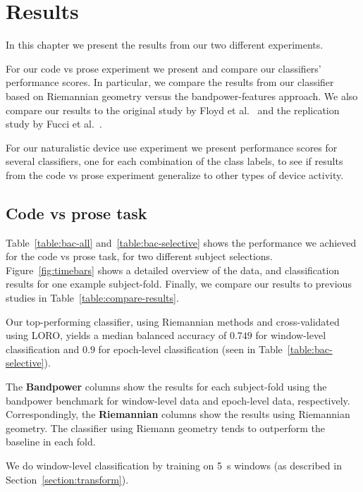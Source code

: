 \chapter{Results}\label{section:results}

    In this chapter we present the results from our two different experiments.

    For our code vs prose experiment we present and compare our classifiers' performance scores. In particular, we compare the results from our classifier based on Riemannian geometry versus the bandpower-features approach. We also compare our results to the original study by Floyd et al.~\cite{floyd_decoding_2017} and the replication study by Fucci et al.~\cite{fucci_replication_2019}. 

    For our naturalistic device use experiment we present performance scores for several classifiers, one for each combination of the class labels, to see if results from the code vs prose experiment generalize to other types of device activity.

    \pagebreak
    \section{Code vs prose task}
        Table~\ref{table:bac-all} and~\ref{table:bac-selective} shows the performance we achieved for the code vs prose task, for two different subject selections. Figure~\ref{fig:timebars} shows a detailed overview of the data, and classification results for one example subject-fold. Finally, we compare our results to previous studies in Table~\ref{table:compare-results}.

        

        Our top-performing classifier, using Riemannian methods and cross-validated using LORO, yields a median balanced accuracy of $0.749$  for window-level classification and $0.9$ for epoch-level classification (seen in Table~\ref{table:bac-selective}).

        The \textbf{Bandpower} columns show the results for each subject-fold using the bandpower benchmark for window-level data and epoch-level data, respectively. Correspondingly, the \textbf{Riemannian} columns show the results using Riemannian geometry. The classifier using Riemann geometry tends to outperform the baseline in each fold.

        We do window-level classification by training on \SI{5}{\second} windows (as described in Section~\ref{section:transform}).

